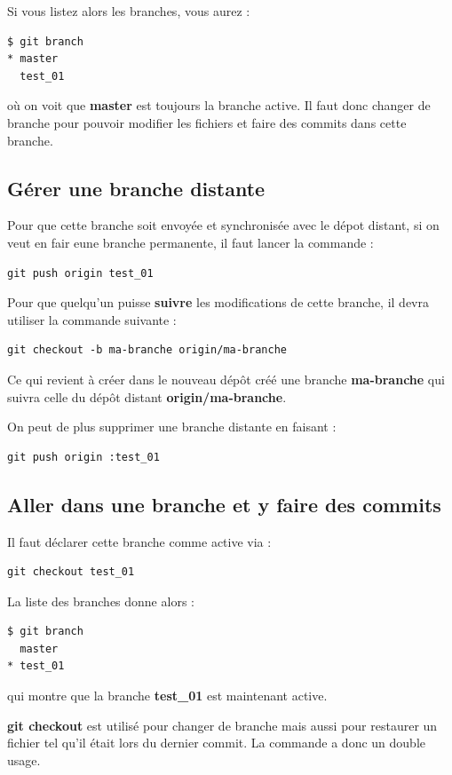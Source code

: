 \documentclass[a4paper,twoside]{article}
\begin{document}
Si vous listez alors les branches, vous aurez :
\begin{verbatim}
$ git branch
* master
  test_01
\end{verbatim}
où on voit que \textbf{master} est toujours la branche active. Il faut donc changer de branche pour pouvoir modifier les fichiers et faire des commits dans cette branche.

\subsection{Gérer une branche distante}
Pour que cette branche soit envoyée et synchronisée avec le dépot distant, si on veut en fair eune branche permanente, il faut lancer la commande :
\begin{verbatim}
git push origin test_01
\end{verbatim}

Pour que quelqu'un puisse \textbf{suivre} les modifications de cette branche, il devra utiliser la commande suivante :
\begin{verbatim}
git checkout -b ma-branche origin/ma-branche
\end{verbatim}

Ce qui revient à créer dans le nouveau dépôt créé une branche \textbf{ma-branche} qui suivra celle du dépôt distant \textbf{origin/ma-branche}.

\bigskip

On peut de plus supprimer une branche distante en faisant : 
\begin{verbatim}
git push origin :test_01
\end{verbatim}

\subsection{Aller dans une branche et y faire des commits}
Il faut déclarer cette branche comme active via :
\begin{verbatim}
git checkout test_01
\end{verbatim}

La liste des branches donne alors :
\begin{verbatim}
$ git branch
  master
* test_01
\end{verbatim}
qui montre que la branche \textbf{test\_01} est maintenant active.

\begin{remarque}
\textbf{git checkout} est utilisé pour changer de branche mais aussi pour restaurer un fichier tel qu'il était lors du dernier commit. La commande a donc un double usage.
\end{remarque}
\end{document}
